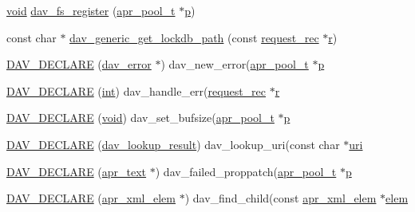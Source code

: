 \begin{DoxyCompactItemize}
\item 
\hyperlink{group__MOD__ISAPI_gacd6cdbf73df3d9eed42fa493d9b621a6}{void} \hyperlink{group__MOD__DAV_ga0c7480ef403d9dc9dfa57e7ef1fa5998}{dav\+\_\+fs\+\_\+register} (\hyperlink{structapr__pool__t}{apr\+\_\+pool\+\_\+t} $\ast$\hyperlink{group__APACHE__CORE__MPM_ga5cd91701e5c167f2b1a38e70ab57817e}{p})
\item 
const char $\ast$ \hyperlink{group__MOD__DAV_ga7a3a1284fe4dbd30659f6bc26d5d8a8c}{dav\+\_\+generic\+\_\+get\+\_\+lockdb\+\_\+path} (const \hyperlink{structrequest__rec}{request\+\_\+rec} $\ast$\hyperlink{pcregrep_8txt_a2e9e9438b26c0bb4425367a7e4f75eb3}{r})
\item 
\hyperlink{group__MOD__DAV_ga1436a9b936474851cda85aedaee6422c}{D\+A\+V\+\_\+\+D\+E\+C\+L\+A\+RE} (\hyperlink{structdav__error}{dav\+\_\+error} $\ast$) dav\+\_\+new\+\_\+error(\hyperlink{structapr__pool__t}{apr\+\_\+pool\+\_\+t} $\ast$\hyperlink{group__APACHE__CORE__MPM_ga5cd91701e5c167f2b1a38e70ab57817e}{p}
\item 
\hyperlink{group__MOD__DAV_ga14c29a4af4cdc80eb0d0a044dc344fb5}{D\+A\+V\+\_\+\+D\+E\+C\+L\+A\+RE} (\hyperlink{pcre_8txt_a42dfa4ff673c82d8efe7144098fbc198}{int}) dav\+\_\+handle\+\_\+err(\hyperlink{structrequest__rec}{request\+\_\+rec} $\ast$\hyperlink{pcregrep_8txt_a2e9e9438b26c0bb4425367a7e4f75eb3}{r}
\item 
\hyperlink{group__MOD__DAV_ga5346cfac22d6d96b13bf3354df96a389}{D\+A\+V\+\_\+\+D\+E\+C\+L\+A\+RE} (\hyperlink{group__MOD__ISAPI_gacd6cdbf73df3d9eed42fa493d9b621a6}{void}) dav\+\_\+set\+\_\+bufsize(\hyperlink{structapr__pool__t}{apr\+\_\+pool\+\_\+t} $\ast$\hyperlink{group__APACHE__CORE__MPM_ga5cd91701e5c167f2b1a38e70ab57817e}{p}
\item 
\hyperlink{group__MOD__DAV_gaadd15801fe862212e7367dabe50780c2}{D\+A\+V\+\_\+\+D\+E\+C\+L\+A\+RE} (\hyperlink{structdav__lookup__result}{dav\+\_\+lookup\+\_\+result}) dav\+\_\+lookup\+\_\+uri(const char $\ast$\hyperlink{group__APR__Util__XML_ga69ec24fb2d0a5f5e532deb9adaab81d6}{uri}
\item 
\hyperlink{group__MOD__DAV_ga61f61992518a57060f4713a266bf3b97}{D\+A\+V\+\_\+\+D\+E\+C\+L\+A\+RE} (\hyperlink{structapr__text}{apr\+\_\+text} $\ast$) dav\+\_\+failed\+\_\+proppatch(\hyperlink{structapr__pool__t}{apr\+\_\+pool\+\_\+t} $\ast$\hyperlink{group__APACHE__CORE__MPM_ga5cd91701e5c167f2b1a38e70ab57817e}{p}
\item 
\hyperlink{group__MOD__DAV_ga14df3471d29b1e34f44a7f72b9d8eb26}{D\+A\+V\+\_\+\+D\+E\+C\+L\+A\+RE} (\hyperlink{structapr__xml__elem}{apr\+\_\+xml\+\_\+elem} $\ast$) dav\+\_\+find\+\_\+child(const \hyperlink{structapr__xml__elem}{apr\+\_\+xml\+\_\+elem} $\ast$\hyperlink{structelem}{elem}

\end{DoxyCompactItemize}
